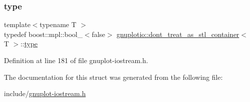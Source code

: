 \subsubsection{\texorpdfstring{type}{type}}
{\footnotesize\ttfamily template$<$typename T $>$ \\
typedef boost\+::mpl\+::bool\+\_\+$<$false$>$ \hyperlink{structgnuplotio_1_1dont__treat__as__stl__container}{gnuplotio\+::dont\+\_\+treat\+\_\+as\+\_\+stl\+\_\+container}$<$ T $>$\+::\hyperlink{structgnuplotio_1_1dont__treat__as__stl__container_aa4404164a7547142376a9140ef07fd2a}{type}}



Definition at line 181 of file gnuplot-\/iostream.\+h.



The documentation for this struct was generated from the following file\+:\begin{DoxyCompactItemize}
\item 
include/\hyperlink{gnuplot-iostream_8h}{gnuplot-\/iostream.\+h}\end{DoxyCompactItemize}

